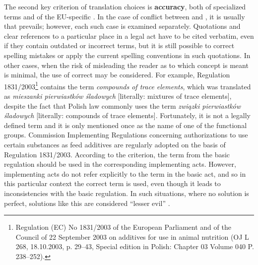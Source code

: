 \documentclass[output=paper]{langsci/langscibook}
\begin{document}
The second key criterion of translation choices is \textbf{accuracy}, both of specialized terms and of the EU-specific . In the case of conflict between  and , it is usually  that prevails; however, each such case is examined separately. Quotations and clear references to a particular place in a legal act have to be cited verbatim, even if they contain outdated or incorrect terms, but it is still possible to correct spelling mistakes or apply the current spelling conventions in such quotations. In other cases, when the risk of misleading the reader as to which concept is meant is minimal, the use of correct  may be considered. For example, Regulation 1831/2003\footnote{Regulation (EC) No 1831/2003 of the European Parliament and of the Council of 22 September 2003 on additives for use in animal nutrition (OJ L 268, 18.10.2003, p. 29--43, Special edition in Polish: Chapter 03 Volume 040 P. 238--252).} contains the term \textit{compounds of trace elements}, which was translated as \textit{mieszanki pierwiastków śladowych} [literally: mixtures of trace elements], despite the fact that Polish law commonly uses the term \textit{związki pierwiastków śladowych} [literally: compounds of trace elements]. Fortunately, it is not a legally defined term and it is only mentioned once as the name of one of the functional groups. Commission Implementing Regulations concerning authorizations to use certain substances as feed additives are regularly adopted on the basis of Regulation 1831/2003. According to the  criterion, the term from the basic regulation should be used in the corresponding implementing acts. However, implementing acts do not refer explicitly to the term in the basic act, and so in this particular context the correct term is used, even though it leads to inconsistencies with the basic regulation. In such situations, where no solution is perfect, solutions like this are considered “lesser evil” \citep[61]{Stefaniak2013}.
\end{document}
